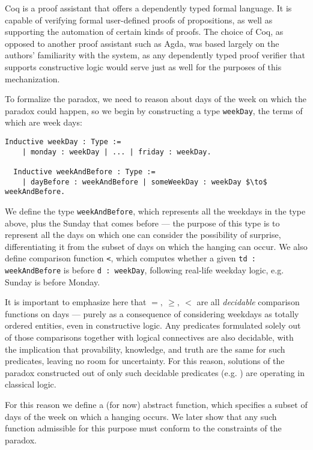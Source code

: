 \documentclass[runningheads]{llncs}
\begin{document}
Coq is a proof assistant that offers a dependently typed formal language.
It is capable of verifying formal user-defined proofs of propositions, as well as supporting
the automation of certain kinds of proofs. The choice of Coq, as opposed to another
proof assistant such as Agda, was based largely on the authors' familiarity with the system,
as any dependently typed proof verifier that supports constructive logic
would serve just as well for the purposes of this mechanization.

To formalize the paradox, we need to reason about days of the week on which
the paradox could happen, so we
begin by constructing a type {\tt weekDay}, the terms of which are week days:

\begin{lstlisting}[mathescape=true]
  Inductive weekDay : Type :=
    | monday : weekDay | ... | friday : weekDay.

  Inductive weekAndBefore : Type :=
    | dayBefore : weekAndBefore | someWeekDay : weekDay $\to$ weekAndBefore.
\end{lstlisting}

We define the type {\tt weekAndBefore}, which represents all the weekdays in
the type above, plus the Sunday that comes before --- the purpose of this type is to
represent all the days on which one can consider the possibility of surprise,
differentiating it from the subset of days on which the hanging can occur. We
also define comparison function {\tt <}, which computes
whether a given {\tt td : weekAndBefore} is before {\tt d : weekDay},
following real-life weekday logic, e.g. Sunday is before Monday.

It is important to emphasize here that $=,~\geq,~<$ are all \emph{decidable}
comparison functions on days --- purely as a consequence of considering weekdays
as totally ordered entities, even in constructive logic. Any predicates
formulated solely out of those comparisons together with logical connectives are also decidable,
with the implication that provability, knowledge, and truth are the same for such predicates,
leaving no room for uncertainty.
For this reason, solutions of the paradox constructed out of only such decidable predicates (e.g. \cite{godelinconsistent})
are operating in classical logic.

For this reason we define a (for now) abstract function, which specifies a subset of
days of the week on which a hanging occurs. We later show that any such function
admissible for this purpose must conform to the constraints of the paradox.
\end{document}
